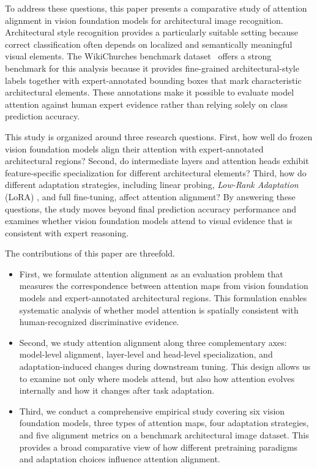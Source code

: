 \documentclass[lineno,pdflatex,sn-mathphys-num]{sn-jnl}%
\theoremstyle{thmstyleone}%
\theoremstyle{thmstyletwo}%
\theoremstyle{thmstylethree}%
\begin{document}
To address these questions, this paper presents a comparative study of attention alignment in vision foundation models for architectural image recognition. Architectural style recognition provides a particularly suitable setting because correct classification often depends on localized and semantically meaningful visual elements. The WikiChurches benchmark dataset~\cite{Barz21WikiChurches} offers a strong benchmark for this analysis because it provides fine-grained architectural-style labels together with expert-annotated bounding boxes that mark characteristic architectural elements. These annotations make it possible to evaluate model attention against human expert evidence rather than relying solely on class prediction accuracy.

This study is organized around three research questions. First, how well do frozen vision foundation models align their attention with expert-annotated architectural regions? Second, do intermediate layers and attention heads exhibit feature-specific specialization for different architectural elements? Third, how do different adaptation strategies, including linear probing, \textit{Low-Rank Adaptation} (LoRA) \cite{hu2022lora}, and full fine-tuning, affect attention alignment? By answering these questions, the study moves beyond final prediction accuracy performance and examines whether vision foundation models attend to visual evidence that is consistent with expert reasoning.

The contributions of this paper are threefold.
\begin{itemize}
\item First, we formulate attention alignment as an evaluation problem that measures the correspondence between attention maps from vision foundation models and expert-annotated architectural regions. This formulation enables systematic analysis of whether model attention is spatially consistent with human-recognized discriminative evidence.
\item Second, we study attention alignment along three complementary axes: model-level alignment, layer-level and head-level specialization, and adaptation-induced changes during downstream tuning. This design allows us to examine not only where models attend, but also how attention evolves internally and how it changes after task adaptation.
\item Third, we conduct a comprehensive empirical study covering six vision foundation models, three types of attention maps, four adaptation strategies, and five alignment metrics on a benchmark architectural image dataset. This provides a broad comparative view of how different pretraining paradigms and adaptation choices influence attention alignment.
\end{itemize}
\end{document}
